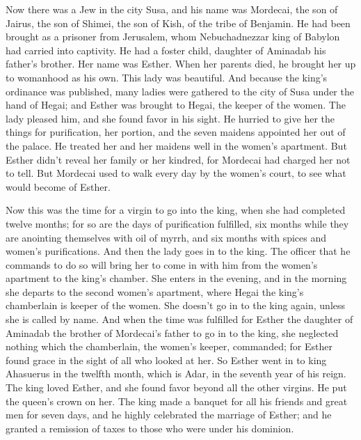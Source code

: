  Now there was a Jew in the city Susa, and his name was
Mordecai, the son of Jairus, the son of Shimei, the son of Kish, of the
tribe of Benjamin.  He had been brought as a prisoner from
Jerusalem, whom Nebuchadnezzar king of Babylon had carried into
captivity.  He had a foster child, daughter of Aminadab his
father's brother. Her name was Esther. When her parents died, he brought
her up to womanhood as his own. This lady was beautiful. 
And because the king's ordinance was published, many ladies were
gathered to the city of Susa under the hand of Hegai; and Esther was
brought to Hegai, the keeper of the women.  The lady pleased
him, and she found favor in his sight. He hurried to give her the things
for purification, her portion, and the seven maidens appointed her out
of the palace. He treated her and her maidens well in the women's
apartment.  But Esther didn't reveal her family or her
kindred, for Mordecai had charged her not to tell.  But
Mordecai used to walk every day by the women's court, to see what would
become of Esther.

 Now this was the time for a virgin to go into the king,
when she had completed twelve months; for so are the days of
purification fulfilled, six months while they are anointing themselves
with oil of myrrh, and six months with spices and women's purifications.
 And then the lady goes in to the king. The officer that he
commands to do so will bring her to come in with him from the women's
apartment to the king's chamber.  She enters in the
evening, and in the morning she departs to the second women's apartment,
where Hegai the king's chamberlain is keeper of the women. She doesn't
go in to the king again, unless she is called by name.  And
when the time was fulfilled for Esther the daughter of Aminadab the
brother of Mordecai's father to go in to the king, she neglected nothing
which the chamberlain, the women's keeper, commanded; for Esther found
grace in the sight of all who looked at her.  So Esther
went in to king Ahasuerus in the twelfth month, which is Adar, in the
seventh year of his reign.  The king loved Esther, and she
found favor beyond all the other virgins. He put the queen's crown on
her.  The king made a banquet for all his friends and great
men for seven days, and he highly celebrated the marriage of Esther; and
he granted a remission of taxes to those who were under his dominion.

